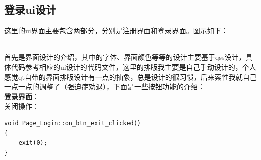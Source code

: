\documentclass{article}
\begin{document}
\subsection{登录ui设计}
这里的ui界面主要包含两部分，分别是注册界面和登录界面。图示如下：
\\
\begin{figure}[H]
  \centering
  \hspace{0.05\textwidth} %
\end{figure}
\\
\noindent
首先是界面设计的介绍，其中的字体、界面颜色等等的设计主要基于qss设计，具体代码参考相应的ui设计的代码文件，这里的排版我主要是自己手动设计的，个人感觉qt自带的界面排版设计有一点的抽象，总是设计的很习惯，后来索性我就自己一点一点的调整了（强迫症劝退），下面是一些按钮功能的介绍：
\\
\indent
\textbf{登录界面}：
\\
\noindent
关闭操作：
\begin{lstlisting}[style=qtstyle, caption={Qt代码示例}, label=qt_example]
    void Page_Login::on_btn_exit_clicked()
{
    exit(0);
}
\end{lstlisting}
\end{document}
